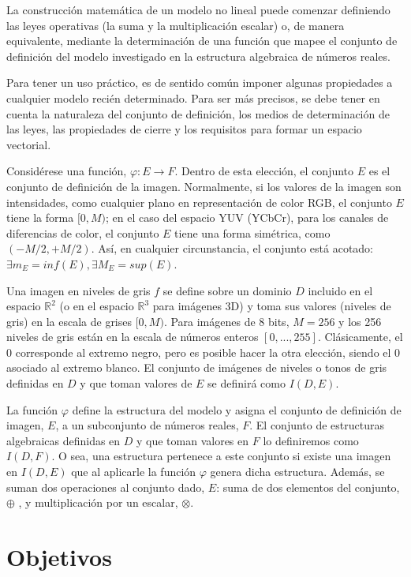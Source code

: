 La construcción matemática de un modelo no lineal puede comenzar definiendo las leyes operativas (la suma y la multiplicación escalar) o, de manera equivalente, mediante la determinación de una función que mapee el conjunto de definición del modelo investigado en la estructura algebraica de números reales.

Para tener un uso práctico, es de sentido común imponer algunas propiedades a cualquier modelo recién determinado. Para ser más precisos, se debe tener en cuenta la naturaleza del conjunto de definición, los medios de determinación de las leyes, las propiedades de cierre y los requisitos para formar un espacio vectorial. 

Consid\'erese una función, $\varphi : E \rightarrow F$. Dentro de esta elección, el conjunto $E$ es el conjunto de definición de la imagen. Normalmente, si los valores de la imagen son intensidades, como cualquier plano en representación de color RGB, el conjunto $E$ tiene la forma $[0,M)$; en el caso del espacio YUV (YCbCr), para los canales de diferencias de color, el conjunto $E$ tiene una forma simétrica, como $( - M/2 , + M/2 )$. Así, en cualquier circunstancia, el conjunto está acotado: $\exists m_E=inf(E),\exists M_E=sup(E)$.

Una imagen en niveles de gris $f$ se define sobre un dominio $D$ incluido en el espacio $\mathbb{R}^2$ (o en el espacio $\mathbb{R}^3$  para imágenes 3D) y toma sus valores (niveles de gris) en la escala de grises $[0, M)$. Para imágenes de 8 bits, $ M = 256$ y los 256 niveles de gris están en la escala de números enteros $[0,..., 255]$. Clásicamente, el 0 corresponde al extremo negro, pero es posible hacer la otra elección, siendo el 0 asociado al extremo blanco. El conjunto de imágenes de niveles o tonos de gris definidas en $D$ y que toman valores de $E$ se definir\'a como $I(D,E)$.

La función $\varphi$ define la estructura del modelo y asigna el conjunto de definición de imagen, $E$, a un subconjunto de números reales, $F$. El conjunto de estructuras algebraicas definidas en $D$ y que toman valores en $F$ lo definiremos como $I(D,F)$. O sea, una estructura pertenece a este conjunto si existe una imagen en $I(D,E)$ que al aplicarle la funci\'on $\varphi$ genera dicha estructura. Además, se suman dos operaciones al conjunto dado, $E$: suma de dos elementos del conjunto, $\oplus$ , y multiplicación por un escalar, $\otimes$.  

\section*{Objetivos}

